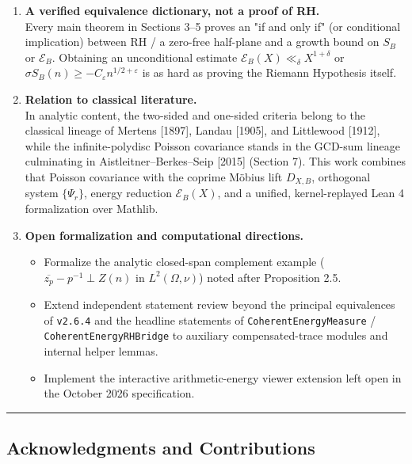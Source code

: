 \documentclass[11pt]{article}
\providecommand{\tightlist}{\setlength{\itemsep}{0pt}\setlength{\parskip}{0pt}}
\begin{document}
\begin{enumerate}
\def\labelenumi{\arabic{enumi}.}
\tightlist
\item
  \textbf{A verified equivalence dictionary, not a proof of RH.}\\
  Every main theorem in Sections 3--5 proves an "if and only if" (or conditional implication) between \(\mathrm{RH}\) / a zero-free half-plane and a growth bound on \(S_B\) or \(\mathscr{E}_B\). Obtaining an unconditional estimate \(\mathscr{E}_B(X) \ll_\delta X^{1+\delta}\) or \(\sigma S_B(n) \ge -C_\varepsilon n^{1/2+\varepsilon}\) is as hard as proving the Riemann Hypothesis itself.
\item
  \textbf{Relation to classical literature.}\\
  In analytic content, the two-sided and one-sided criteria belong to the classical lineage of Mertens {[}1897{]}, Landau {[}1905{]}, and Littlewood {[}1912{]}, while the infinite-polydisc Poisson covariance stands in the GCD-sum lineage culminating in Aistleitner--Berkes--Seip {[}2015{]} (Section 7). This work combines that Poisson covariance with the coprime Möbius lift \(D_{X,B}\), orthogonal system \(\{\Psi_r\}\), energy reduction \(\mathscr{E}_B(X)\), and a unified, kernel-replayed Lean 4 formalization over Mathlib.
\item
  \textbf{Open formalization and computational directions.}

  \begin{itemize}
  \tightlist
  \item
    Formalize the analytic closed-span complement example (\(\overline{z_p} - p^{-1} \perp Z(n)\) in \(L^2(\Omega, \nu)\)) noted after Proposition 2.5.
  \item
    Extend independent statement review beyond the principal equivalences of \texttt{v2.6.4} and the headline statements of \texttt{CoherentEnergyMeasure} / \texttt{CoherentEnergyRHBridge} to auxiliary compensated-trace modules and internal helper lemmas.
  \item
    Implement the interactive arithmetic-energy viewer extension left open in the October 2026 specification.
  \end{itemize}
\end{enumerate}

\begin{center}\rule{0.5\linewidth}{0.5pt}\end{center}

\subsection{Acknowledgments and Contributions}\label{acknowledgments-and-contributions}
\end{document}
